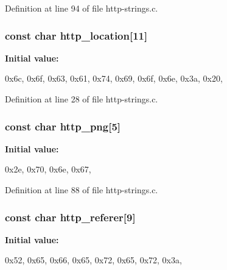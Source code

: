 Definition at line 94 of file http-\/strings.c.

\hypertarget{http-strings_8c_ae44cdccc053a527b644269f796af7e62}{
\subsubsection[{http\_\-location}]{\setlength{\rightskip}{0pt plus 5cm}const char {\bf http\_\-location}\mbox{[}11\mbox{]}}}
\label{http-strings_8c_ae44cdccc053a527b644269f796af7e62}
{\bfseries Initial value:}
\begin{DoxyCode}
 

{0x6c, 0x6f, 0x63, 0x61, 0x74, 0x69, 0x6f, 0x6e, 0x3a, 0x20, }
\end{DoxyCode}


Definition at line 28 of file http-\/strings.c.

\hypertarget{http-strings_8c_a2d5a64e8568607133bdf64f53ab719e6}{
\subsubsection[{http\_\-png}]{\setlength{\rightskip}{0pt plus 5cm}const char {\bf http\_\-png}\mbox{[}5\mbox{]}}}
\label{http-strings_8c_a2d5a64e8568607133bdf64f53ab719e6}
{\bfseries Initial value:}
\begin{DoxyCode}
 

{0x2e, 0x70, 0x6e, 0x67, }
\end{DoxyCode}


Definition at line 88 of file http-\/strings.c.

\hypertarget{http-strings_8c_a52402a0f5f1a643cf91cec0333241654}{
\subsubsection[{http\_\-referer}]{\setlength{\rightskip}{0pt plus 5cm}const char {\bf http\_\-referer}\mbox{[}9\mbox{]}}}
\label{http-strings_8c_a52402a0f5f1a643cf91cec0333241654}
{\bfseries Initial value:}
\begin{DoxyCode}
 

{0x52, 0x65, 0x66, 0x65, 0x72, 0x65, 0x72, 0x3a, }
\end{DoxyCode}


